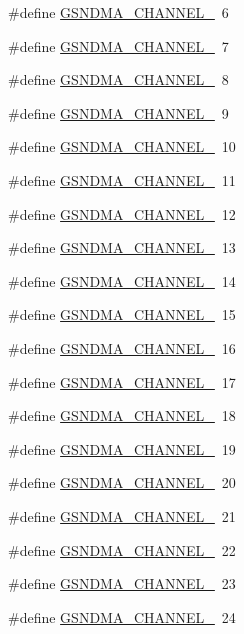 \begin{DoxyCompactItemize}
\item 
\#define \hyperlink{a00484_a60b20ca60701a2e09dbaa2e35205c63d}{GSNDMA\_\-CHANNEL\_}~6
\item 
\#define \hyperlink{a00484_a1dc12024a1645e9628a8228eb3d600fc}{GSNDMA\_\-CHANNEL\_}~7
\item 
\#define \hyperlink{a00484_a59184a849d87060a1aa4af080be777bc}{GSNDMA\_\-CHANNEL\_}~8
\item 
\#define \hyperlink{a00484_a9b9e452e110eedb35f128e734e16ef64}{GSNDMA\_\-CHANNEL\_}~9
\item 
\#define \hyperlink{a00484_a6600eb8ee630a08b0d530bb68b12edb7}{GSNDMA\_\-CHANNEL\_}~10
\item 
\#define \hyperlink{a00484_a000b4af780c11b29b0010f675e3cbc60}{GSNDMA\_\-CHANNEL\_}~11
\item 
\#define \hyperlink{a00484_ad0ad6437e0dd4308a5ca860908308136}{GSNDMA\_\-CHANNEL\_}~12
\item 
\#define \hyperlink{a00484_a8a6f986b828460b28e9c9cc6ce0c7885}{GSNDMA\_\-CHANNEL\_}~13
\item 
\#define \hyperlink{a00484_adb6390cb7cc7ceb1567ac4caf1260ba9}{GSNDMA\_\-CHANNEL\_}~14
\item 
\#define \hyperlink{a00484_a149bbd1fd7faa66916ec0b2a26bdbfc5}{GSNDMA\_\-CHANNEL\_}~15
\item 
\#define \hyperlink{a00484_ac41ac8d6de662c1ef0301da9dbcd6bca}{GSNDMA\_\-CHANNEL\_}~16
\item 
\#define \hyperlink{a00484_adc1496eca719c822510a6bdee111230c}{GSNDMA\_\-CHANNEL\_}~17
\item 
\#define \hyperlink{a00484_a86871f85d077136b43ce24da7401fb46}{GSNDMA\_\-CHANNEL\_}~18
\item 
\#define \hyperlink{a00484_aec041d8e41a8b26360fd73662dbdf0ad}{GSNDMA\_\-CHANNEL\_}~19
\item 
\#define \hyperlink{a00484_a78570f42d54d0cceddf5ac3e76ef5883}{GSNDMA\_\-CHANNEL\_}~20
\item 
\#define \hyperlink{a00484_a3e4b4c6574e761b8a7ca12976be7da2d}{GSNDMA\_\-CHANNEL\_}~21
\item 
\#define \hyperlink{a00484_a95f0b82527fdf9419ba78afedde7606f}{GSNDMA\_\-CHANNEL\_}~22
\item 
\#define \hyperlink{a00484_abd4020cf11e9fb4f581ae3ed06b26f38}{GSNDMA\_\-CHANNEL\_}~23
\item 
\#define \hyperlink{a00484_a2716f45e9773e71249d1da5033e11363}{GSNDMA\_\-CHANNEL\_}~24
\item 

\end{DoxyCompactItemize}
